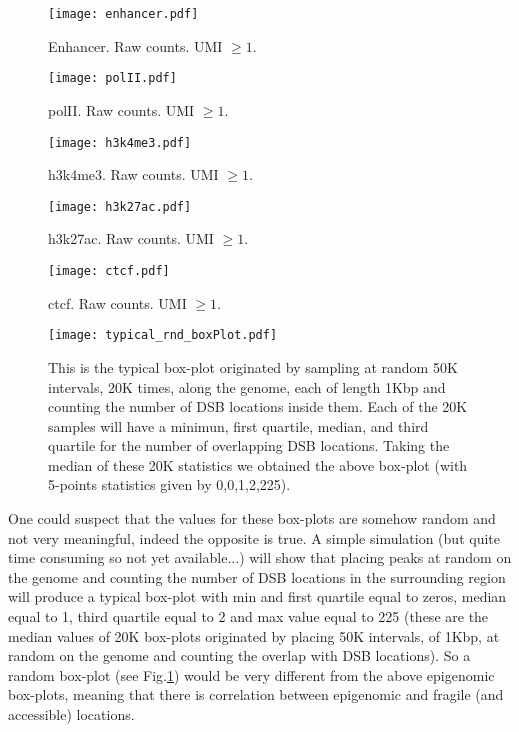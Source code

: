 \documentclass[11pt,a4paper]{article}
\begin{document}
\begin{figure}[hbtp]
\begin{minipage}[t]{0.45\textwidth}
\texttt{[image: enhancer.pdf]}
\caption{Enhancer. Raw counts. UMI $\geq 1$.}
\label{fig:enhancer}
\end{minipage}
\hspace{\fill}
\begin{minipage}[t]{0.5\textwidth}
\texttt{[image: polII.pdf]}
\caption{polII. Raw counts. UMI $\geq 1$.}
\label{fig:polII}
\end{minipage}
\vspace*{0.5cm} %
\begin{minipage}[t]{0.45\textwidth}
\texttt{[image: h3k4me3.pdf]}
\caption{h3k4me3. Raw counts. UMI $\geq 1$.}
\label{fig:h3k4me3}
\end{minipage}
\hspace{\fill}
\begin{minipage}[t]{0.45\textwidth}
\texttt{[image: h3k27ac.pdf]}
\caption{h3k27ac. Raw counts. UMI $\geq 1$.}
\label{fig:h3k27ac}
\end{minipage}
\vspace*{0.5cm} %
\begin{minipage}[t]{0.45\textwidth}
\texttt{[image: ctcf.pdf]}
\caption{ctcf. Raw counts. UMI $\geq 1$.}
\label{fig:ctcf}
\end{minipage}
\hspace{\fill}
\begin{minipage}[t]{0.45\textwidth}
\texttt{[image: typical\_rnd\_boxPlot.pdf]}
\caption{This is the typical box-plot originated by sampling at random 50K intervals, 20K times, along the genome, each of length 1Kbp and counting the number of DSB locations inside them. Each of the 20K samples will have a minimun, first quartile, median, and third quartile for the number of overlapping DSB locations. Taking the median of these 20K statistics we obtained the above box-plot (with 5-points statistics given by 0,0,1,2,225).}
\label{fig:typical_rnd_boxPlot}
\end{minipage}
\end{figure}

One could suspect that the values for these box-plots are somehow random and not very meaningful, indeed the opposite is true. A simple simulation (but quite time consuming so not yet available...) will show that placing peaks at random on the genome and counting the number of DSB locations in the surrounding region will produce a typical box-plot with min and first quartile equal to zeros, median equal to 1, third quartile equal to 2 and max value equal to 225 (these are the median values of 20K box-plots originated by placing 50K intervals, of 1Kbp, at random on the genome and counting the overlap with DSB locations). So a random box-plot (see Fig.\ref{fig:typical_rnd_boxPlot}) would be very different from the above epigenomic box-plots, meaning that there is correlation between epigenomic and fragile (and accessible) locations. 
\end{document}
